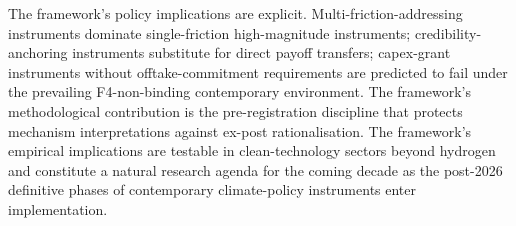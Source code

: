 \documentclass[12pt,a4paper]{article}
\theoremstyle{plain}
\theoremstyle{definition}
\begin{document}
The framework's policy implications are explicit. Multi-friction-addressing instruments dominate single-friction high-magnitude instruments; credibility-anchoring instruments substitute for direct payoff transfers; capex-grant instruments without offtake-commitment requirements are predicted to fail under the prevailing F4-non-binding contemporary environment. The framework's methodological contribution is the pre-registration discipline that protects mechanism interpretations against ex-post rationalisation. The framework's empirical implications are testable in clean-technology sectors beyond hydrogen and constitute a natural research agenda for the coming decade as the post-2026 definitive phases of contemporary climate-policy instruments enter implementation.



\end{document}
